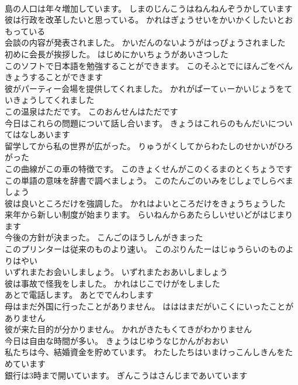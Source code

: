 \documentclass[8pt]{extreport}
\begin{document}
\begin{CJK}{UTF8}{min}
\\	島の人口は年々増加しています。	しまのじんこうはねんねんぞうかしています 
\\	彼は行政を改革したいと思っている。	かれはぎょうせいをかいかくしたいとおもっている 
\\	会談の内容が発表されました。	かいだんのないようがはっぴょうされました 
\\	初めに会長が挨拶した。	はじめにかいちょうがあいさつした 
\\	このソフトで日本語を勉強することができます。	このそふとでにほんごをべんきょうすることができます 
\\	彼がパーティー会場を提供してくれました。	かれがぱーてぃーかいじょうをていきょうしてくれました 
\\	この温泉はただです。	このおんせんはただです 
\\	今日はこれらの問題について話し合います。	きょうはこれらのもんだいについてはなしあいます 
\\	留学してから私の世界が広がった。	りゅうがくしてからわたしのせかいがひろがった 
\\	この曲線がこの車の特徴です。	このきょくせんがこのくるまのとくちょうです 
\\	この単語の意味を辞書で調べましょう。	このたんごのいみをじしょでしらべましょう 
\\	彼は良いところだけを強調した。	かれはよいところだけをきょうちょうした 
\\	来年から新しい制度が始まります。	らいねんからあたらしいせいどがはじまります 
\\	今後の方針が決まった。	こんごのほうしんがきまった 
\\	このプリンターは従来のものより速い。	このぷりんたーはじゅうらいのものよりはやい 
\\	いずれまたお会いしましょう。	いずれまたおあいしましょう 
\\	彼は事故で怪我をしました。	かれはじこでけがをしました 
\\	あとで電話します。	あとででんわします 
\\	母はまだ外国に行ったことがありません。	はははまだがいこくにいったことがありません 
\\	彼が来た目的が分かりません。	かれがきたもくてきがわかりません 
\\	今日は自由な時間が多い。	きょうはじゆうなじかんがおおい 
\\	私たちは今、結婚資金を貯めています。	わたしたちはいまけっこんしきんをためています 
\\	銀行は3時まで開いています。	ぎんこうはさんじまであいています 

\end{CJK}
\end{document}
